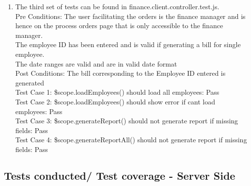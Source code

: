 \documentclass[a4paper,12pt]{report}
\begin{document}
\begin{enumerate}
\item The third set of tests can be found in finance.client.controller.test.js.\\
Pre Conditions: The user facilitating the orders is the finance manager and is hence on the process orders page that is only accessible to the finance manager. \\ The employee ID has been entered and is valid if generating a bill for single employee. \\ The date ranges are valid and are in valid date format \\
Post Conditions: The bill corresponding to the Employee ID entered is generated\\
Test Case 1: \$scope.loadEmployees() should load all employees: Pass\\
Test Case 2: \$scope.loadEmployees() should show error if cant load employees: Pass\\
Test Case 3: \$scope.generateReport() should not generate report if missing fields: Pass\\
Test Case 4: \$scope.generateReportAll() should not generate report if missing fields: Pass \\

\end{enumerate}

\subsection{Tests conducted/ Test coverage - Server Side}
\end{document}
